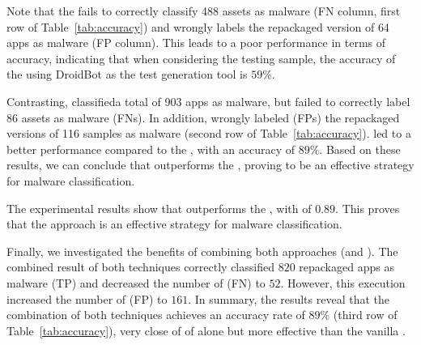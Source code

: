 Note that the \mas fails to correctly classify 488 assets as malware (FN column, first row of Table~\ref{tab:accuracy})
and wrongly labels the repackaged version of $64$ apps as malware (FP column). This
leads to a poor performance in terms of accuracy, indicating that when considering the \fds testing sample,
the accuracy of the \mas using DroidBot as the test generation tool is $59\%$.

Contrasting, \droidxpflow classifieda total of 903 apps as malware, but failed to correctly label 86 assets as malware (FNs).
In addition, \droidxpflow wrongly labeled (FPs) the repackaged versions of 116 samples as malware
(second row of Table~\ref{tab:accuracy}). \droidxpflow led to a better performance compared to the \mas,
with an accuracy of $89\%$. Based on these results, we can conclude that \droidxpflow outperforms the \mas, proving to be an effective
strategy for malware classification. 

\begin{finding}
  The experimental results show that \droidxpflow outperforms the \mas, with \fone of $0.89$. This proves that the
  approach is an effective strategy for malware classification.
\end{finding}


\begin{table}
  \caption{Accuracy of both strategy on \fds (1220 samples).}
  \label{tab:accuracy}
\end{table}




Finally, we investigated the benefits of combining both approaches (\mas and \droidxpflow). The combined result of both techniques correctly classified $820$ repackaged apps as malware (TP) and decreased the number of (FN) to $52$. However, this execution increased the number of (FP) to $161$. In summary, the results reveal that the combination of both techniques achieves an accuracy rate of $89$\% (third row of Table~\ref{tab:accuracy}), very close of \fone of \droidxpflow alone but more effective than the vanilla \mas.

